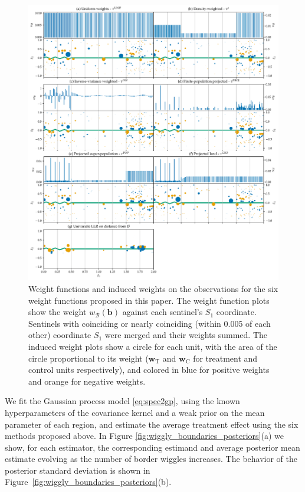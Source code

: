 \documentclass[letter]{article}
\makeatletter
\def\maxwidth{\ifdim\Gin@nat@width>\linewidth\linewidth
\else\Gin@nat@width\fi}
\let\Oldincludegraphics\includegraphics
\renewcommand{\includegraphics}[1]{\Oldincludegraphics[width=0.9\maxwidth]{#1}}
\newcommand{\treat}{\mathrm{T}}
\newcommand{\ctrol}{\mathrm{C}}
\newcommand{\wvec}{\mathbold{w}}
\newcommand{\border}{\mathcal{B}}
\newcommand{\sentinel}{\bm{b}}
\newcommand{\weightb}{w_{\border}}
\newcommand{\wt}{\wvec_{\treat}}
\newcommand{\wc}{\wvec_{\ctrol}}
\makeatother
\begin{document}
    	\begin{figure}
\centering
\includegraphics{../figures/weight_functions.pdf}
\caption{\label{fig:weight_functions}Weight functions and induced weights on the observations for the six weight functions proposed in this paper. The weight function plots show the weight \(\weightb(\sentinel)\) against each sentinel's \(S_1\) coordinate. Sentinels with coinciding or nearly coinciding (within 0.005 of each other) coordinate \(S_1\) were merged and their weights summed. The induced weight plots show a circle for each unit, with the area of the circle proportional to its weight (\(\wt\) and \(\wc\) for treatment and control units respectively), and colored in blue for positive weights and orange for negative weights.}
\end{figure}
    


    	We fit the Gaussian process model \eqref{eq:spec2gp},
using the known hyperparameters of the covariance kernel and a weak prior on the mean parameter of each region,
and estimate the average treatment effect using the six methods proposed above.
In Figure \ref{fig:wiggly_boundaries_posteriors}(a) we show, for each estimator, the corresponding estimand and average posterior mean estimate evolving as the number of border wiggles increases.
The behavior of the posterior standard deviation is shown in Figure~\ref{fig:wiggly_boundaries_posteriors}(b).
\end{document}
